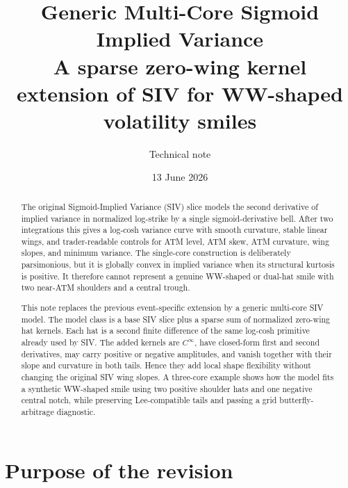 \documentclass[11pt]{article}
\title{Generic Multi-Core Sigmoid Implied Variance\\
\large A sparse zero-wing kernel extension of SIV for WW-shaped volatility smiles}
\author{Technical note}
\date{13 June 2026}
\begin{document}
\maketitle

\begin{abstract}
The original Sigmoid-Implied Variance (SIV) slice models the second derivative of implied variance in normalized log-strike by a single sigmoid-derivative bell.  After two integrations this gives a log-cosh variance curve with smooth curvature, stable linear wings, and trader-readable controls for ATM level, ATM skew, ATM curvature, wing slopes, and minimum variance.  The single-core construction is deliberately parsimonious, but it is globally convex in implied variance when its structural kurtosis is positive.  It therefore cannot represent a genuine WW-shaped or dual-hat smile with two near-ATM shoulders and a central trough.

This note replaces the previous event-specific extension by a generic multi-core SIV model.  The model class is a base SIV slice plus a sparse sum of normalized zero-wing hat kernels.  Each hat is a second finite difference of the same log-cosh primitive already used by SIV.  The added kernels are $C^\infty$, have closed-form first and second derivatives, may carry positive or negative amplitudes, and vanish together with their slope and curvature in both tails.  Hence they add local shape flexibility without changing the original SIV wing slopes.  A three-core example shows how the model fits a synthetic WW-shaped smile using two positive shoulder hats and one negative central notch, while preserving Lee-compatible tails and passing a grid butterfly-arbitrage diagnostic.
\end{abstract}

\tableofcontents

\section{Purpose of the revision}
\end{document}
